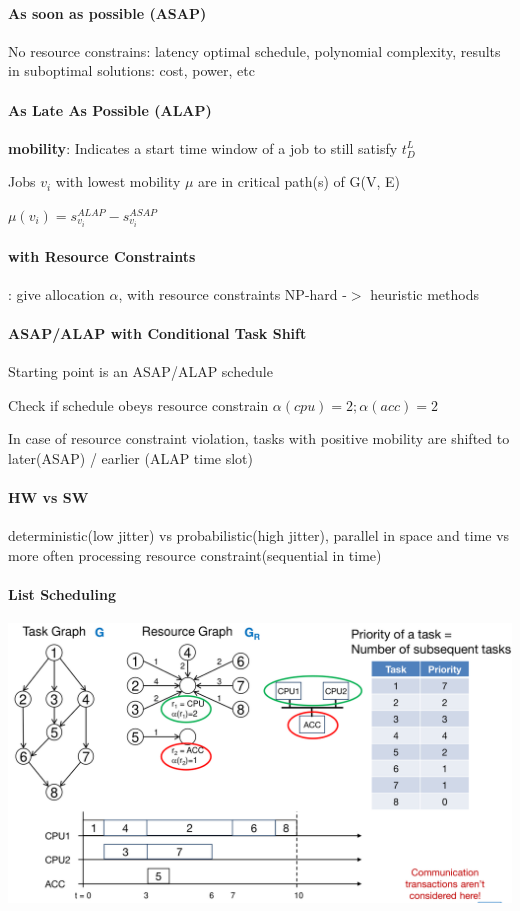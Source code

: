 \documentclass[english]{latex4ei/latex4ei_sheet}
\begin{document}
\paragraph{As soon as possible (ASAP)}
No resource constrains: latency optimal schedule, polynomial complexity, results in suboptimal solutions: cost, power, etc

\paragraph{As Late As Possible (ALAP)}
\textbf{mobility}: Indicates a start time window of a job to still satisfy $t_D^L$ 

Jobs $v_i$ with lowest mobility $\mu$ are in critical path(s) of G(V, E)

$\mu(v_i) = s_{v_i}^{ALAP} - s_{v_i}^{ASAP}$

\paragraph{with Resource Constraints}: give allocation $\alpha$, with resource constraints NP-hard -$>$ heuristic methods

\paragraph{ASAP/ALAP with Conditional Task Shift}
Starting point is an ASAP/ALAP schedule

Check if schedule obeys resource constrain $\alpha(cpu) = 2; \alpha(acc) = 2$ 

In case of resource constraint violation, tasks with positive mobility are shifted to later(ASAP) / earlier (ALAP time slot)

\paragraph{HW vs SW}
deterministic(low jitter) vs probabilistic(high jitter), parallel in space and time vs more often processing resource constraint(sequential in time)

\paragraph{List Scheduling} 


\begin{center}
  \includegraphics[width=0.8\linewidth]{assets/ListSchedulingExample.png}
  \label{fig:listschedulingexample}
\end{center}
\end{document}
